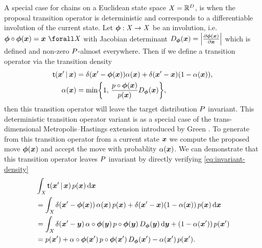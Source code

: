 A special case for chains on a Euclidean state space $\mathit{X} = \mathbb{R}^D$, is when the proposal transition operator is deterministic and corresponds to a differentiable involution of the current state. Let $\boldsymbol{\phi} : \mathit{X} \to \mathit{X}$ be an involution, i.e. $\vct{\phi} \circ \vct{\phi}(\vct{x}) = \vct{x} ~\forall \set{X}$ with Jacobian determinant $\jacobproddet{\vct{\phi}}{\vct{x}} = \left|\pd{\vct{\phi}(\vct{x})}{\vct{x}}\right|$ which is defined and non-zero $P$-almost everywhere. Then if we define a transition operator via the transition density
\begin{equation}\label{eq:metropolis-hastings-transition-deterministic-proposal}
\begin{split}
  \trans(\vct{x}' \gvn \vct{x}) &=
  \delta\lpa\vct{x}' - \vct{\phi}(\vct{x})\rpa \alpha(\vct{x}) +
  \delta(\vct{x}' - \vct{x}) \lpa 1 - \alpha(\vct{x}) \rpa,
  \\
  \alpha(\vct{x}) &=
  \min\lbr 
    1,\,\frac{\tgtdens \circ \vct{\phi}(\vct{x})}{\tgtdens(\vct{x})} \jacobproddet{\vct{\phi}}{\vct{x}}
  \rbr,
\end{split}
\end{equation}
then this transition operator will leave the target distribution $P$ invariant. This deterministic transition operator variant is as a special case of the trans-dimensional Metropolis--Hastings extension introduced by Green \citep{green1995reversible,geyer2003metropolis}. To generate from this transition operator from a current state $\boldsymbol{x}$ we compute the proposed move $\boldsymbol{\phi}(\boldsymbol{x})$ and accept the move with probablity $\alpha(\boldsymbol{x})$. We can demonstrate that this transition operator leaves $P$ invariant by directly verifying \eqref{eq:invariant-density}
\begin{align}
  \label{eq:mh-det-proposal-derivation-1}
  &\int_{\set{X}} \trans(\vct{x}' \gvn \vct{x}) \, \tgtdens(\vct{x}) \,\dr\vct{x}
  \\
  \label{eq:mh-det-proposal-derivation-2}
  &=
  \int_{\set{X}} 
    \delta\lpa\vct{x}' - \vct{\phi}(\vct{x})\rpa \,\alpha(\vct{x}) \, \tgtdens(\vct{x}) +
    \delta(\vct{x}' - \vct{x}) \lpa 1 - \alpha(\vct{x}) \rpa \, \tgtdens(\vct{x})
  \,\dr\vct{x}
  \\
  \label{eq:mh-det-proposal-derivation-3}
  &=
  \int_{\set{X}} 
    \delta\lpa\vct{x}' - \vct{y}\rpa \,\alpha\circ\vct{\phi}(\vct{y}) \, 
    \tgtdens\circ\vct{\phi}(\vct{y}) \, \jacobproddet{\vct{\phi}}{\vct{y}} \,\dr\vct{y} +
  \lpa 1 - \alpha(\vct{x}') \rpa \, \tgtdens(\vct{x}')
  \\
  \label{eq:mh-det-proposal-derivation-4}
  &=
  p(\vct{x}') +
  \alpha\circ\vct{\phi}(\vct{x}') \, \tgtdens\circ\vct{\phi}(\vct{x}') \, 
  \jacobproddet{\vct{\phi}}{\vct{x}'} -
  \alpha(\vct{x}') \, \tgtdens(\vct{x}').
\end{align}
